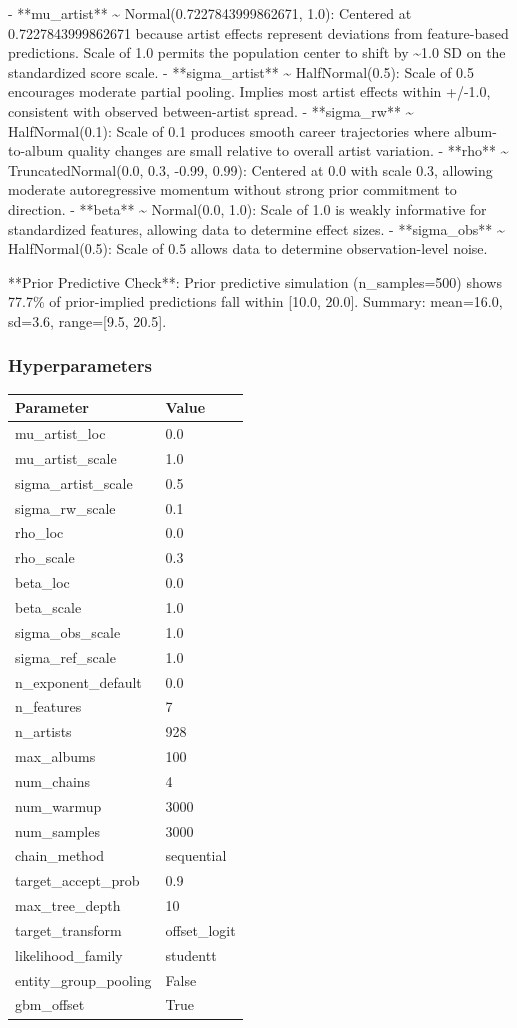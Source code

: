 \documentclass{article}
\begin{document}
- **mu\_artist** \textasciitilde{} Normal(0.7227843999862671, 1.0): Centered at 0.7227843999862671 because artist effects represent deviations from feature-based predictions. Scale of 1.0 permits the population center to shift by \textasciitilde{}1.0 SD on the standardized score scale.
- **sigma\_artist** \textasciitilde{} HalfNormal(0.5): Scale of 0.5 encourages moderate partial pooling. Implies most artist effects within +/-1.0, consistent with observed between-artist spread.
- **sigma\_rw** \textasciitilde{} HalfNormal(0.1): Scale of 0.1 produces smooth career trajectories where album-to-album quality changes are small relative to overall artist variation.
- **rho** \textasciitilde{} TruncatedNormal(0.0, 0.3, -0.99, 0.99): Centered at 0.0 with scale 0.3, allowing moderate autoregressive momentum without strong prior commitment to direction.
- **beta** \textasciitilde{} Normal(0.0, 1.0): Scale of 1.0 is weakly informative for standardized features, allowing data to determine effect sizes.
- **sigma\_obs** \textasciitilde{} HalfNormal(0.5): Scale of 0.5 allows data to determine observation-level noise.


**Prior Predictive Check**: Prior predictive simulation (n\_samples=500) shows 77.7\% of prior-implied predictions fall within [10.0, 20.0]. Summary: mean=16.0, sd=3.6, range=[9.5, 20.5].

\subsubsection*{Hyperparameters}
\begin{tabular}{ll}
\toprule
Parameter & Value \\
\midrule
mu\_artist\_loc & 0.0 \\
mu\_artist\_scale & 1.0 \\
sigma\_artist\_scale & 0.5 \\
sigma\_rw\_scale & 0.1 \\
rho\_loc & 0.0 \\
rho\_scale & 0.3 \\
beta\_loc & 0.0 \\
beta\_scale & 1.0 \\
sigma\_obs\_scale & 1.0 \\
sigma\_ref\_scale & 1.0 \\
n\_exponent\_default & 0.0 \\
n\_features & 7 \\
n\_artists & 928 \\
max\_albums & 100 \\
num\_chains & 4 \\
num\_warmup & 3000 \\
num\_samples & 3000 \\
chain\_method & sequential \\
target\_accept\_prob & 0.9 \\
max\_tree\_depth & 10 \\
target\_transform & offset\_logit \\
likelihood\_family & studentt \\
entity\_group\_pooling & False \\
gbm\_offset & True \\
\bottomrule
\end{tabular}
\end{document}
